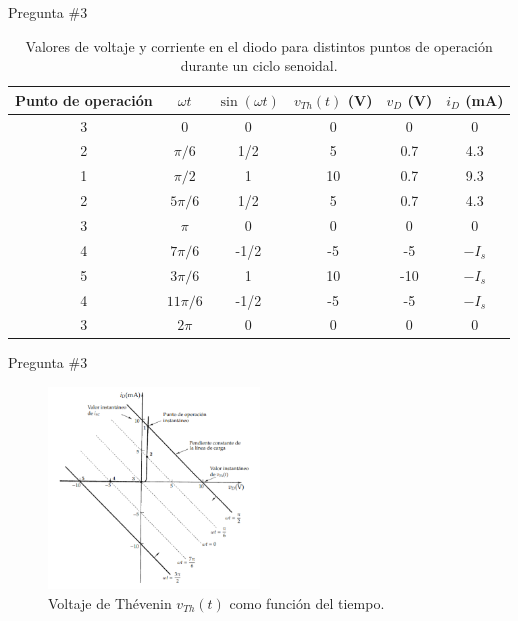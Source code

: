 \documentclass[
    10pt,
    aspectratio=169,
    xcolor={dvipsnames},
    spanish,
    ]{beamer}
\begin{document}
\begin{frame}{Pregunta \#3}
\begin{table}[H]
  \centering
  \begin{tabular}{c c c c c c}
    \hline
    Punto de operación & $\omega t$ & $\sin(\omega t)$ & $v_{Th}(t)$ (V) & $v_D$ (V) & $i_D$ (mA) \\
    \hline
    3 & 0 & 0 & 0 & 0 & 0 \\
    2 & $\pi/6$ & 1/2 & 5 & 0.7 & 4.3 \\
    1 & $\pi/2$ & 1 & 10 & 0.7 & 9.3 \\
    2 & $5\pi/6$ & 1/2 & 5 & 0.7 & 4.3 \\
    3 & $\pi$ & 0 & 0 & 0 & 0 \\
    4 & $7\pi/6$ & -1/2 & -5 & -5 & $-I_s$ \\
    5 & $3\pi/6$ & 1 & 10 & -10 & $-I_s$ \\
    4 & $11\pi/6$ & -1/2 & -5 & -5 & $-I_s$ \\
    3 & $2\pi$ & 0 & 0 & 0 & 0 \\
    \hline
  \end{tabular}
  \caption{Valores de voltaje y corriente en el diodo para distintos puntos de operación durante un ciclo senoidal.}
  \label{tab:diodo-operacion}
\end{table}
\end{frame}
\begin{frame}{Pregunta \#3}
\begin{figure}[H]
    \centering
\includegraphics[width=0.5\textwidth]{Auxiliar_4_17}
    \caption{Voltaje de Thévenin $v_{Th}(t)$ como función del tiempo.}
    \label{fig:voltaje-th}
\end{figure}
  \end{frame}
\end{document}
